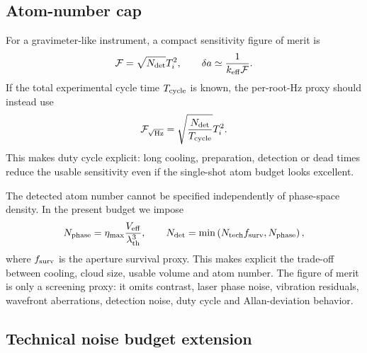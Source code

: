 \documentclass[11pt,a4paper]{article}
\begin{document}
\subsection{Atom-number cap}

For a gravimeter-like instrument, a compact sensitivity figure of merit is
\begin{equation}
{\cal F}=\sqrt{N_{\rm det}}T_i^2,
\qquad
\delta a\simeq\frac{1}{k_{\rm eff}{\cal F}}.
\end{equation}
If the total experimental cycle time $T_{\rm cycle}$ is known, the
per-root-Hz proxy should instead use
\begin{equation}
{\cal F}_{\sqrt{\rm Hz}}=\sqrt{\frac{N_{\rm det}}{T_{\rm cycle}}}T_i^2.
\end{equation}
This makes duty cycle explicit: long cooling, preparation, detection or dead
times reduce the usable sensitivity even if the single-shot atom budget looks
excellent.

The detected atom number cannot be specified independently of phase-space
density. In the present budget we impose
\begin{equation}
N_{\rm phase}=\eta_{\max}\frac{V_{\rm eff}}{\lambda_{\rm th}^3},
\qquad
N_{\rm det}=\min\left(N_{\rm tech}f_{\rm surv},N_{\rm phase}\right),
\end{equation}
where $f_{\rm surv}$ is the aperture survival proxy. This makes explicit the
trade-off between cooling, cloud size, usable volume and atom number.
The figure of merit is only a screening proxy: it omits contrast, laser phase
noise, vibration residuals, wavefront aberrations, detection noise, duty cycle
and Allan-deviation behavior.

\subsection{Technical noise budget extension}
\end{document}
